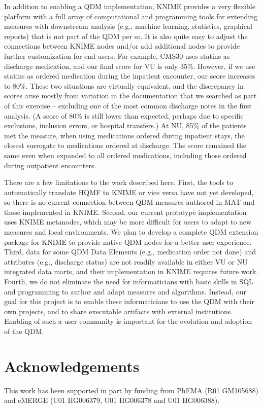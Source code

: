 \documentclass{article}
\begin{document}
In addition to enabling a QDM implementation, KNIME provides a very flexible platform with a full array of computational and programming tools for extending measures with downstream analysis (e.g., machine learning, statistics, graphical reports) that is not part of the QDM per se. It is also quite easy to adjust the connections between KNIME nodes and/or add additional nodes to provide further customization for end users. For example, CMS30 uses statins as discharge medication, and our final score for VU is only 35\%. However, if we use statins as ordered medication during the inpatient encounter, our score increases to 80\%. These two situations are virtually equivalent, and the discrepancy in scores arise mostly from variation in the documentation that we searched as part of this exercise -- excluding one of the most common discharge notes in the first analysis. (A score of 80\% is still lower than expected, perhaps due to specific exclusions, inclusion errors, or hospital transfers.) At NU, 85\% of the patients met the measure, when using medications ordered during inpatient stays, the closest surrogate to medications ordered at discharge. The score remained the same even when expanded to all ordered medications, including those ordered during outpatient encounters.

There are a few limitations to the work described here. First, the tools to automatically translate HQMF to KNIME or vice versa have not yet developed, so there is no current connection between QDM measures authored in MAT and those implemented in KNIME. Second, our current prototype implementation uses KNIME metanodes, which may be more difficult for users to adapt to new measures and local environments. We plan to develop a complete QDM extension package for KNIME to provide native QDM nodes for a better user experience. Third, data for some QDM Data Elements (e.g., medication order not done) and attributes (e.g., discharge status) are not readily available in either VU or NU integrated data marts, and their implementation in KNIME requires future work. Fourth, we do not eliminate the need for informaticians with basic skills in SQL and programming to author and adapt measures and algorithms. Instead, our goal for this project is to enable these informaticians to use the QDM with their own projects, and to share executable artifacts with external institutions. Enabling of such a user community is important for the evolution and adoption of the QDM.

\section{Acknowledgements}

This work has been supported in part by funding from PhEMA (R01 GM105688) and eMERGE (U01 HG006379, U01 HG006378 and U01 HG006388).

\centering


\end{document}
